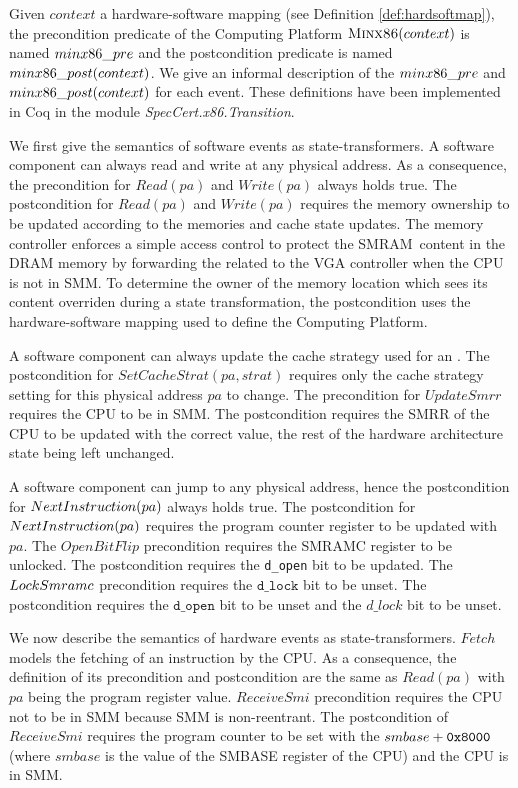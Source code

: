 \label{page:minx86def} Given $context$ a hardware-software mapping (see
Definition \ref{def:hardsoftmap}), the precondition predicate of the Computing
Platform $\textsc{Minx86}(context)$ is named $min\-x86\_pre$ and the
postcondition predicate is named $min\-x86\_post(con\-text)$. We give an
informal description of the $min\-x86\_pre$ and $minx\-86\_post(context)$ for
each event. These definitions have been implemented in Coq in the module
\emph{Spec\-Cert.x86.Transi\-tion}.

We first give the semantics of software events as state-transformers. A software
component can always read and write at any physical address. As a consequence,
the precondition for $Read(pa)$ and $Write(pa)$ always holds true. The
postcondition for $Read(pa)$ and $Write(pa)$ requires the memory ownership to be
updated according to the memories and cache state updates. The memory controller
enforces a simple access control to protect the SMRAM content in the DRAM memory
by forwarding the related \IO to the VGA controller when the CPU is not in SMM.
To determine the owner of the memory location which sees its content overriden
during a state transformation, the postcondition uses the hardware-software
mapping used to define the Computing Platform.

A software component can always update the cache strategy used for an \IO. The
postcondition for $SetCacheStrat(pa,strat)$ requires only the cache strategy
setting for this physical address $pa$ to change. The precondition for
$UpdateSmrr$ requires the CPU to be in SMM. The postcondition requires the SMRR
of the CPU to be updated with the correct value, the rest of the hardware
architecture state being left unchanged.

A software component can jump to any physical address, hence the postcondition
for $NextInstru\-ction(pa)$ always holds true. The postcondition for
$NextInstru\-ction(pa)$ requires the program counter register to be updated with
$pa$. The $OpenBitFlip$ precondition requires the SMRAMC register to be
unlocked. The postcondition requires the \texttt{d\_open} bit to be updated. The
$Lock\-Smramc$ precondition requires the $\texttt{d\_lock}$ bit to be unset. The
postcondition requires the $\texttt{d\_open}$ bit to be unset and the $d\_lock$
bit to be unset.

We now describe the semantics of hardware events as state-transformers. $Fetch$
models the fetching of an instruction by the CPU. As a consequence, the
definition of its precondition and postcondition are the same as $Read(pa)$ with
$pa$ being the program register value.  $ReceiveSmi$ precondition requires the
CPU not to be in SMM because SMM is non-reentrant.  The postcondition of
$ReceiveSmi$ requires the program counter to be set with the $smbase +
\mathtt{0x8000}$ (where $smbase$ is the value of the SMBASE register of the CPU)
and the CPU is in SMM.

